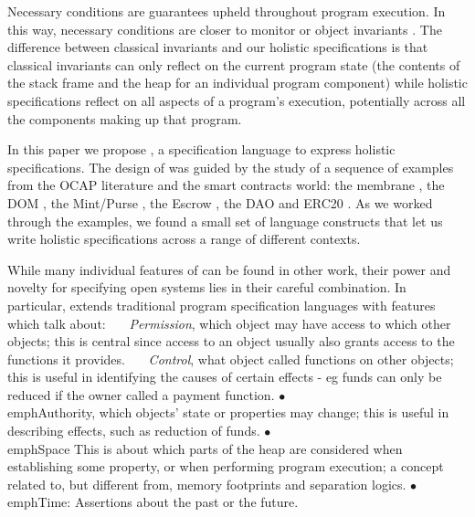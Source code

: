 Necessary conditions are guarantees upheld throughout program execution.
In this way, 
necessary conditions are closer to monitor or object
invariants \cite{Hoare74,Meyer97}. The difference between 
classical invariants and our holistic specifications is that classical invariants can only reflect  on
the current program state (\ie the contents of the
stack frame and the heap for an individual program component) while
holistic specifications reflect on all aspects of a program's
execution, potentially across all the components making up that program.


In this paper we propose \Chainmail, a specification language to
express holistic specifications.
The design of \Chainmail was guided by the study of a sequence of
examples from the OCAP literature and the smart contracts world: the
membrane \cite{membranesJavascript}, the DOM \cite{dd,ddd}, the Mint/Purse \cite{MillerPhD}, the Escrow \cite{FTfJP14}, the DAO \cite{Dao,DaoBug} and
ERC20 \cite{ERC20}.  As we worked through the
examples, we found a small set of language constructs that let us
write holistic specifications across a range of different contexts.
%
 
While many individual features of \Chainmail can be found in other work, 
their power and novelty for specifying open systems lies in their careful combination.
In particular, \Chainmail extends 
traditional program specification languages\cite{Leavens-etal07,Meyer92} with features which talk about:
%
\ \ \textbullet \ \emph{Permission}, \ie which object may have access to which other objects; 
this is central since access to an object usually also grants access to the functions it provides.
%
\ \ \textbullet  \ \emph{Control}, \ie what  object called functions on other objects; this
 is useful in identifying the causes of certain effects - eg 
funds can only be reduced if the owner called a payment function.
%
$\bullet$ \ \\emph{Authority}, \ie  which objects' state or properties may change; this is useful in describing effects, such as reduction of funds.
%
$\bullet$ \ \\emph{Space} This is about which parts of the heap are considered when establishing some property, or when 
performing program execution; a concept
related to, but different from, memory footprints and separation logics.
$\bullet$ \ \\emph{Time}: Assertions about the past or the future.


